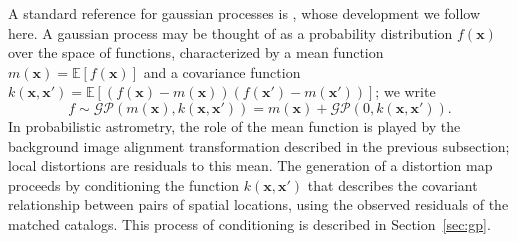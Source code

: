 \documentclass[manuscript]{aastex}
\begin{document}
A standard reference for gaussian processes is \citet{rasmussen2006gaussian}, whose development we follow here. A gaussian process may be thought of as a probability distribution $f(\mathbf{x})$ over the space of functions, characterized by a mean function $m(\mathbf{x}) = \mathbb{E}\left[f(\mathbf{x})\right]$ and a covariance function $k(\mathbf{x},\mathbf{x}') = \mathbb{E}\left[\left(f(\mathbf{x})-m(\mathbf{x})\right) \left(f(\mathbf{x}')-m(\mathbf{x}')\right)\right]$; we write
\begin{equation}
f \sim \mathcal{GP}(m(\mathbf{x}), k(\mathbf{x},\mathbf{x}')) = m(\mathbf{x}) + \mathcal{GP}(0, k(\mathbf{x},\mathbf{x}')).
\end{equation}
In probabilistic astrometry, the role of the mean function is played by the background image alignment transformation described in the previous subsection; local distortions are residuals to this mean. The generation of a distortion map proceeds by conditioning the function $k(\mathbf{x},\mathbf{x}')$ that describes the covariant relationship between pairs of spatial locations, using the observed residuals of the matched catalogs. This process of conditioning is described in Section~\ref{sec:gp}.
\end{document}
